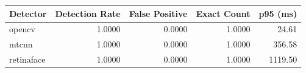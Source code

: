 \begin{tabular}{lrrrr}
\hline
Detector & Detection Rate & False Positive & Exact Count & p95 (ms) \\
\hline
opencv & 1.0000 & 0.0000 & 1.0000 & 24.61 \\
mtcnn & 1.0000 & 0.0000 & 1.0000 & 356.58 \\
retinaface & 1.0000 & 0.0000 & 1.0000 & 1119.50 \\
\hline
\end{tabular}
